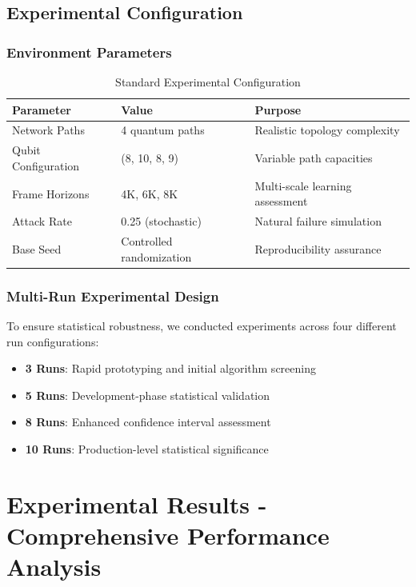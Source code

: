 \documentclass[12pt,a4paper]{article}
\begin{document}
\subsection{Experimental Configuration}

\subsubsection{Environment Parameters}
\begin{table}[H]
\centering
\caption{Standard Experimental Configuration}
\begin{tabular}{|l|l|l|}
\hline
\textbf{Parameter} & \textbf{Value} & \textbf{Purpose} \\
\hline
\hline
Network Paths & 4 quantum paths & Realistic topology complexity \\
Qubit Configuration & (8, 10, 8, 9) & Variable path capacities \\
Frame Horizons & 4K, 6K, 8K & Multi-scale learning assessment \\
Attack Rate & 0.25 (stochastic) & Natural failure simulation \\
Base Seed & Controlled randomization & Reproducibility assurance \\
\hline
\end{tabular}
\end{table}

\subsubsection{Multi-Run Experimental Design}

To ensure statistical robustness, we conducted experiments across four different run configurations:

\begin{itemize}
\item \textbf{3 Runs}: Rapid prototyping and initial algorithm screening
\item \textbf{5 Runs}: Development-phase statistical validation  
\item \textbf{8 Runs}: Enhanced confidence interval assessment
\item \textbf{10 Runs}: Production-level statistical significance
\end{itemize}

\section{Experimental Results - Comprehensive Performance Analysis}
\end{document}
